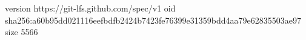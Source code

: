 version https://git-lfs.github.com/spec/v1
oid sha256:a60b95dd021116eefbdfb2424b7423fe76399e31359bdd4aa79e62835503ae97
size 5566
